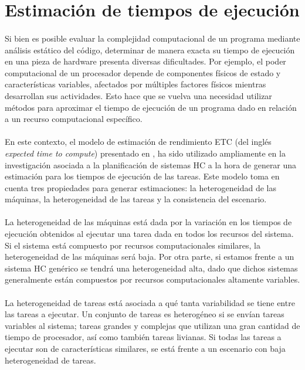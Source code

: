 \newpage %

\section{Estimación de tiempos de ejecución} \label{section:descripcion-problema,subsection:estimacion-tiempo-ejecucion}

\paragraph{}Si bien es posible evaluar la complejidad computacional de un programa mediante análisis estático del código, determinar de manera exacta su tiempo de ejecución en una pieza de hardware presenta diversas dificultades.
Por ejemplo, el poder computacional de un procesador depende de componentes físicos de estado y características variables, afectados por múltiples factores físicos mientras desarrollan sus actividades.
Esto hace que se vuelva una necesidad utilizar métodos para aproximar el tiempo de ejecución de un programa dado en relación a un recurso computacional específico.

\paragraph{}En este contexto, el modelo de estimación de rendimiento ETC (del inglés \textit{expected time to compute}) presentado en \citet{bib-ali-hc-etc}, ha sido utilizado ampliamente en la investigación asociada a la planificación de sistemas HC a la hora de generar una estimación para los tiempos de ejecución de las tareas.
Este modelo toma en cuenta tres propiedades para generar estimaciones: la heterogeneidad de las máquinas, la heterogeneidad de las tareas y la consistencia del escenario.

\paragraph{}La heterogeneidad de las máquinas está dada por la variación en los tiempos de ejecución obtenidos al ejecutar una tarea dada en todos los recursos del sistema.
Si el sistema está compuesto por recursos computacionales similares, la heterogeneidad de las máquinas será baja.
Por otra parte, si estamos frente a un sistema HC genérico se tendrá una heterogeneidad alta, dado que dichos sistemas generalmente están compuestos por recursos computacionales altamente variables.

\paragraph{}La heterogeneidad de tareas está asociada a qué tanta variabilidad se tiene entre las tareas a ejecutar.
Un conjunto de tareas es heterogéneo si se envían tareas variables al sistema; tareas grandes y complejas que utilizan una gran cantidad de tiempo de procesador, así como también tareas livianas.
Si todas las tareas a ejecutar son de características similares, se está frente a un escenario con baja heterogeneidad de tareas.

